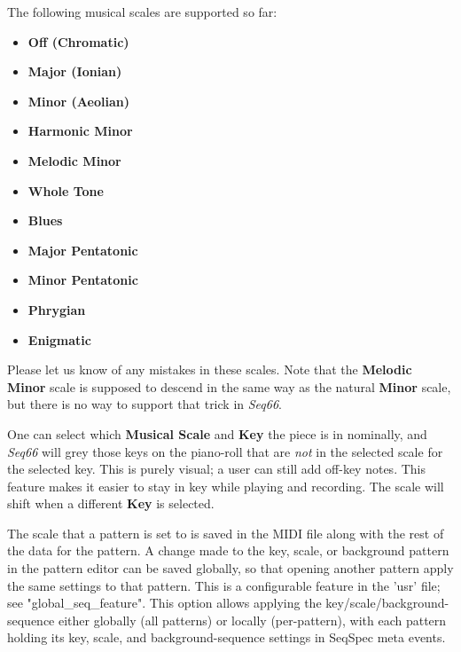    The following musical scales are supported so far:

   \begin{itemize}
      \item \textbf{Off (Chromatic)}
      \item \textbf{Major (Ionian)}
      \item \textbf{Minor (Aeolian)}
      \item \textbf{Harmonic Minor}
      \item \textbf{Melodic Minor}
      \item \textbf{Whole Tone}
      \item \textbf{Blues}
      \item \textbf{Major Pentatonic}
      \item \textbf{Minor Pentatonic}
      \item \textbf{Phrygian}
      \item \textbf{Enigmatic}
   \end{itemize}

   Please let us know of any mistakes in these scales.
   Note that the \textbf{Melodic Minor} scale is supposed to
   descend in the same way as the natural \textbf{Minor} scale, but
   there is no way to support that trick in \textsl{Seq66}.

   One can select which \textbf{Musical Scale} and
   \textbf{Key} the piece is in nominally,
   and \textsl{Seq66} will grey those keys on the piano-roll that
   are \textsl{not} in the selected scale for the selected key.
   This is purely visual; a user can still add off-key notes.
   This feature makes it easier to stay in key while playing and recording.
   The scale will shift when a different \textbf{Key} is selected.

   The scale that a pattern is set to is
   saved in the MIDI file along with the rest of the data for the pattern.
   A change made to the key, scale, or background pattern in
   the pattern editor can be saved globally, so that opening another pattern
   apply the same settings to that pattern.  This is a configurable feature in
   the 'usr' file; see "global\_seq\_feature".
   This option allows applying the key/scale/background-sequence
   either globally (all patterns) or locally (per-pattern), with each pattern
   holding its key, scale, and background-sequence settings in
   SeqSpec meta events.


